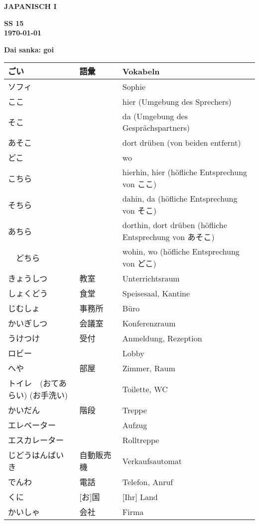 \documentclass[a4paper,10pt]{article}
\def\header#1#2#3#4#5#6{\pagestyle{empty}
\noindent
\begin{minipage}[t]{0.6\textwidth}
\begin{flushleft}
\bf #4\\%
#5 %
\end{flushleft}
\end{minipage}
\begin{minipage}[t]{0.4\textwidth}
\begin{flushright}
\bf #6\\
#2 %
\end{flushright}
\end{minipage}

\begin{center}
{\Large\bf Dai sanka: goi} %

\end{center}
}
\begin{document}
\header{Nr. 2 \\}{\today}{11.05.15}{JAPANISCH I}{}{SS 15}
\pagestyle{plain}
\begin{CJK}{UTF8}{min}
\begin{center}
\begin{longtable}{|p{4cm}|p{2cm}|p{8cm}|}
  \hline
  ごい & 語彙 & Vokabeln \\
  \hline \hline
  ソフィ	& & Sophie \\
  \hline
  ここ　& & hier (Umgebung des Sprechers) \\
  \hline  
  そこ  & & da (Umgebung des Gespr\"achspartners) \\  
  \hline
  あそこ	& & dort dr\"uben (von beiden entfernt) \\
  \hline
  どこ　& & wo \\
  \hline  
  こちら  & & hierhin, hier (h\"ofliche Entsprechung von ここ)\\
  \hline
  そちら	& & dahin, da (h\"ofliche Entsprechung von そこ)\\
  \hline
  あちら　& & dorthin, dort dr\"uben (h\"ofliche Entsprechung von \newline あそこ)\\
  \hline
　どちら  & & wohin, wo (h\"ofliche Entsprechung von どこ)\\
  \hline
  きょうしつ & 教室 & Unterrichtsraum\\
  \hline
  しょくどう & 食堂　　& Speisesaal, Kantine \\
  \hline
  じむしょ　& 事務所　& B\"uro\\
  \hline  
  かいぎしつ　& 会議室　& Konferenzraum\\
  \hline
  うけつけ &	受付　& Anmeldung, Rezeption\\
  \hline
  ロビー　& & Lobby\\
  \hline  
  へや &	部屋　& Zimmer, Raum\\
  \hline
  トイレ　(おてあらい) (お手洗い) & & Toilette, WC\\
  \hline
  かいだん &	階段　& Treppe\\
  \hline  
  エレベーター & & Aufzug\\
  \hline
  エスカレーター & & Rolltreppe\\
  \hline
  じどうはんばいき	& 自動販売機　& Verkaufsautomat\\
  \hline  
  でんわ & 電話  & Telefon, Anruf\\
  \hline
  [お]くに & [お]国	& [Ihr] Land \\
  \hline
  かいしゃ &	会社　& Firma\\

\end{longtable}
\end{center}
\end{CJK}
\end{document}
